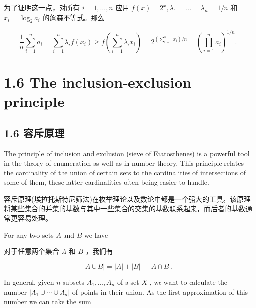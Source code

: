 \documentclass[10pt]{article}
\begin{document}
\begin{tcolorbox}\relax
为了证明这一点，对所有 \(i = 1,\ldots ,n\) 应用 \(f\left( x\right)  = {2}^{x},{\lambda }_{1} = \ldots  = {\lambda }_{n} = 1/n\) 和 \({x}_{i} = {\log }_{2}{a}_{i}\) 的詹森不等式。那么
\end{tcolorbox}

\[
\frac{1}{n}\mathop{\sum }\limits_{{i = 1}}^{n}{a}_{i} = \mathop{\sum }\limits_{{i = 1}}^{n}{\lambda }_{i}f\left( {x}_{i}\right)  \geq  f\left( {\mathop{\sum }\limits_{{i = 1}}^{n}{\lambda }_{i}{x}_{i}}\right)  = {2}^{\left( {\mathop{\sum }\limits_{{i = 1}}^{n}{x}_{i}}\right) /n} = {\left( \mathop{\prod }\limits_{{i = 1}}^{n}{a}_{i}\right) }^{1/n}.
\]

\section*{1.6 The inclusion-exclusion principle}

\begin{tcolorbox}\relax
\section*{1.6 容斥原理}
\end{tcolorbox}

The principle of inclusion and exclusion (sieve of Eratosthenes) is a powerful tool in the theory of enumeration as well as in number theory. This principle relates the cardinality of the union of certain sets to the cardinalities of intersections of some of them, these latter cardinalities often being easier to handle.

\begin{tcolorbox}\relax
容斥原理(埃拉托斯特尼筛法)在枚举理论以及数论中都是一个强大的工具。该原理将某些集合的并集的基数与其中一些集合的交集的基数联系起来，而后者的基数通常更容易处理。
\end{tcolorbox}

For any two sets \(A\) and \(B\) we have

\begin{tcolorbox}\relax
对于任意两个集合 \(A\) 和 \(B\) ，我们有
\end{tcolorbox}

\[
\left| {A \cup  B}\right|  = \left| A\right|  + \left| B\right|  - \left| {A \cap  B}\right| .
\]

In general, given \(n\) subsets \({A}_{1},\ldots ,{A}_{n}\) of a set \(X\) , we want to calculate the number \(\left| {{A}_{1} \cup  \cdots  \cup  {A}_{n}}\right|\) of points in their union. As the first approximation of this number we can take the sum
\end{document}
